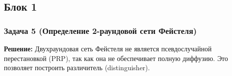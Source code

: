 ﻿\documentclass[9pt,a4paper]{extarticle}
\begin{document}
\subsection{Блок 1}\label{ux431ux43bux43eux43a-1}

\subsubsection{Задача 5 (Определение 2-раундовой сети Фейстеля)}\label{ux437ux430ux434ux430ux447ux430-5-ux43eux43fux440ux435ux434ux435ux43bux435ux43dux438ux435-2-ux440ux430ux443ux43dux434ux43eux432ux43eux439-ux441ux435ux442ux438-ux444ux435ux439ux441ux442ux435ux43bux44f}

\textbf{Решение:} Двухраундовая сеть Фейстеля не является псевдослучайной перестановкой (PRP), так как она не обеспечивает полную диффузию. Это позволяет построить различитель (distinguisher).
\end{document}
